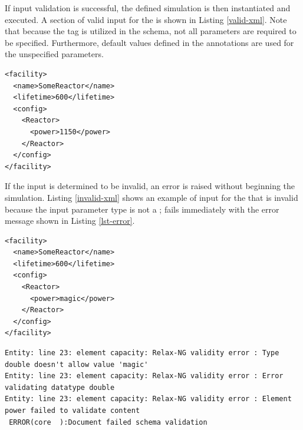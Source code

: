 If
input validation is successful, the defined simulation is then instantiated and
executed. A section of valid input for the  is shown in Listing
\ref{valid-xml}. Note that because the  tag is utilized in the
schema, not all parameters are required to be specified. Furthermore, default
values defined in the   annotations are
used for the unspecified parameters.

\lstset{language=XML}
\begin{lstlisting}[caption={A Valid Input Snippet for the Simple Reactor}, 
                   label=valid-xml]
<facility>
  <name>SomeReactor</name>
  <lifetime>600</lifetime>
  <config>
    <Reactor>
      <power>1150</power>
    </Reactor>
  </config>
</facility>
\end{lstlisting}

If the input is determined to be invalid, an error is raised without
beginning the simulation. Listing \ref{invalid-xml} shows an example of input for
the  that is invalid because the  input parameter
type is not a ; \Cyclus fails immediately with the error message
shown in Listing \ref{lst-error}.

\lstset{language=XML}
\begin{lstlisting}[caption={An Invalid Input Snippet for the Simple Reactor}, 
                   label=invalid-xml]
<facility>
  <name>SomeReactor</name>
  <lifetime>600</lifetime>
  <config>
    <Reactor>
      <power>magic</power>
    </Reactor>
  </config>
</facility>
\end{lstlisting}

\lstset{language=bash}
\begin{lstlisting}[caption={A \Cyclus Error Message from the Invalid 
      Input in Listing \ref{invalid-xml}}, 
                   label=lst-error]
Entity: line 23: element capacity: Relax-NG validity error : Type double doesn't allow value 'magic'
Entity: line 23: element capacity: Relax-NG validity error : Error validating datatype double
Entity: line 23: element capacity: Relax-NG validity error : Element power failed to validate content
 ERROR(core  ):Document failed schema validation
\end{lstlisting}
